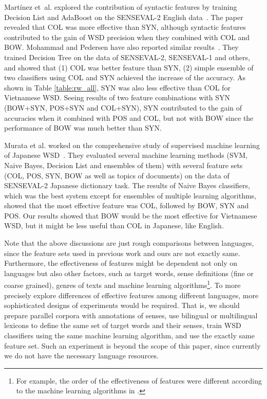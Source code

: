 \documentclass[english]{jnlp_1.4}
\begin{document}
Mart\'{i}nez et~al. explored the contribution of syntactic features 
by training Decision List and AdaBoost
on the SENSEVAL-2 English data~\cite{martinez:02:a}.
The paper revealed that COL was more effective than SYN,
although syntactic features contributed to the gain of WSD precision
when they combined with COL and BOW.
Mohammad and Pedersen have also reported
similar results~\cite{mohammad:04:a}.
They trained Decision Tree on the data of SENSEVAL-2, SENSEVAL-1 and others,
and showed that (1) COL was better feature than SYN, 
(2) simple ensemble of two classifiers using COL and SYN
achieved the increase of the accuracy.
As shown in Table \ref{table:rw_all},
SYN was also less effective than COL for Vietnamese WSD.
Seeing results of two feature combinations with SYN (BOW+SYN, POS+SYN and COL+SYN),
SYN contributed to the gain of accuracies when it combined with POS and COL, but not with BOW since the performance of BOW was much better than SYN.

Murata et al. worked on the comprehensive study of supervised machine
learning of Japanese WSD~\cite{murata:03:a}.
They evaluated several machine learning methods
(SVM, Naive Bayes, Decision List and ensembles of them)
with several feature sets (COL, POS, SYN, BOW as well as topics of documents)
on the data of SENSEVAL-2 Japanese dictionary task.
The results of Naive Bayes classifiers,
which was the best system except for ensembles of multiple learning
algorithms, showed that 
the most effective feature was COL, followed by BOW, SYN and POS.
Our results showed that BOW would be the most effective for Vietnamese
WSD, but it might be less useful than COL in Japanese, like English.

Note that the above discussions are just rough comparisons
between languages,
since the feature sets used in previous work and ours are not exactly same.
Furthermore, the effectiveness of features might be dependent
not only on languages but also other factors, such as target words,
sense definitions (fine or coarse grained),
genres of texts and machine learning algorithms\footnote{
  For example, the order of the effectiveness of features
  were different according to the machine learning algorithms
  in \cite{murata:03:a}.
}.
To more precisely explore differences of effective features
among different languages,
more sophisticated designs of experiments would be required.
That is,
we should prepare parallel corpora with annotations of senses,
use bilingual or multilingual lexicons
to define the same set of target words and their senses,
train WSD classifiers using the same machine learning algorithm,
and use the exactly same feature set.
Such an experiment is beyond the scope of this paper,
since currently we do not have the necessary language resources.
\end{document}
